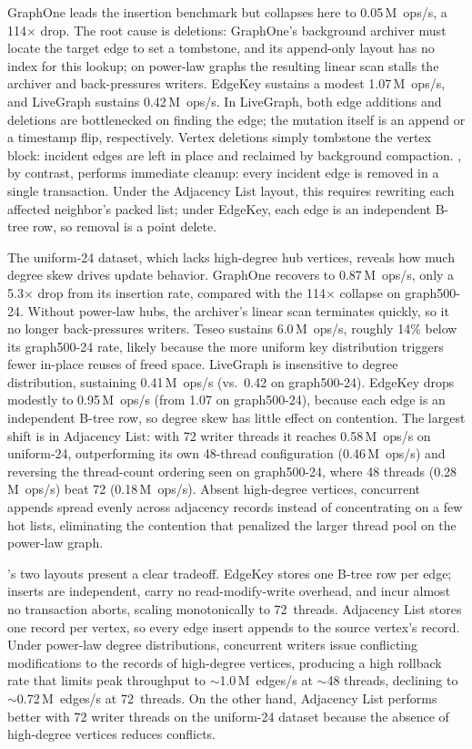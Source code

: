 GraphOne leads the insertion benchmark but collapses here to 0.05\,M~ops/s, a 114$\times$ drop.
The root cause is deletions: GraphOne's background archiver must locate the target edge to set a tombstone, and its append-only layout has no index for this lookup; on power-law graphs the resulting linear scan stalls the archiver and back-pressures writers.
\project{} EdgeKey sustains a modest 1.07\,M~ops/s, and LiveGraph sustains 0.42\,M~ops/s.
In LiveGraph, both edge additions and deletions are bottlenecked on finding the edge; the mutation itself is an append or a timestamp flip, respectively.
Vertex deletions simply tombstone the vertex block: incident edges are left in place and reclaimed by background compaction.
\project{}, by contrast, performs immediate cleanup: every incident edge is removed in a single transaction.
Under the Adjacency List layout, this requires rewriting each affected neighbor's packed list; under EdgeKey, each edge is an independent B-tree row, so removal is a point delete.

The uniform-24 dataset, which lacks high-degree hub vertices, reveals how much degree skew drives update behavior.
GraphOne recovers to 0.87\,M~ops/s, only a 5.3$\times$ drop from its insertion rate, compared with the 114$\times$ collapse on graph500-24.
Without power-law hubs, the archiver's linear scan terminates quickly, so it no longer back-pressures writers.
Teseo sustains 6.0\,M~ops/s, roughly 14\% below its graph500-24 rate, likely because the more uniform key distribution triggers fewer in-place reuses of freed space.
LiveGraph is insensitive to degree distribution, sustaining 0.41\,M~ops/s (vs.\ 0.42 on graph500-24).
\project{} EdgeKey drops modestly to 0.95\,M~ops/s (from 1.07 on graph500-24), because each edge is an independent B-tree row, so degree skew has little effect on contention.
The largest shift is in Adjacency List: with 72 writer threads it reaches 0.58\,M~ops/s on uniform-24, outperforming its own 48-thread configuration (0.46\,M~ops/s) and reversing the thread-count ordering seen on graph500-24, where 48 threads (0.28\,M~ops/s) beat 72 (0.18\,M~ops/s).
Absent high-degree vertices, concurrent appends spread evenly across adjacency records instead of concentrating on a few hot lists, eliminating the contention that penalized the larger thread pool on the power-law graph.

\project{}'s two layouts present a clear tradeoff.
EdgeKey stores one B-tree row per edge; inserts are independent, carry no read-modify-write overhead, and incur almost no transaction aborts, scaling monotonically to 72~threads.
Adjacency List stores one record per vertex, so every edge insert appends to the source vertex's record.
Under power-law degree distributions, concurrent writers issue conflicting modifications to the records of high-degree vertices, producing a high rollback rate that limits peak throughput to ${\sim}$1.0\,M~edges/s at ${\sim}$48 threads, declining to ${\sim}$0.72\,M~edges/s at 72~threads.
On the other hand, Adjacency List performs better with 72 writer threads on the uniform-24 dataset because the absence of high-degree vertices reduces conflicts.

